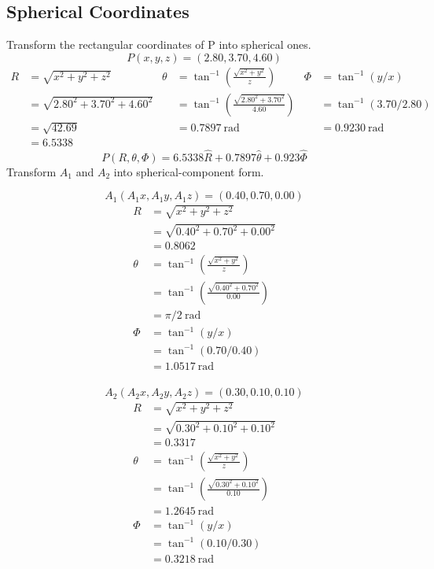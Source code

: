 \documentclass[12pt]{article}
\begin{document}
\subsection{Spherical Coordinates}
Transform the rectangular coordinates of P into spherical ones. $$ P(x,y,z) = (2.80,3.70,4.60) $$
\[
    \begin{aligned}
        R &= \sqrt{x^2+y^2+z^2} & \theta &= \tan^{-1}\left(\frac{\sqrt{x^2+y^2}}{z}\right) & \Phi &= \tan^{-1}\left(y/x\right) \\
        &=\sqrt{2.80^2+3.70^2+4.60^2} & &=\tan^{-1}\left(\frac{\sqrt{2.80^2+3.70^2}}{4.60}\right) & &=\tan^{-1}\left(3.70/2.80\right) \\
        &=\sqrt{42.69} & &= 0.7897 \ \text{rad} & &=0.9230 \ \text{rad} \\
        &= 6.5338
    \end{aligned}
\]
$$ P(R,\theta,\Phi) = 6.5338\hat{R} + 0.7897\hat{\theta} + 0.923\hat{\Phi}$$
Transform $A_1$ and $A_2$ into spherical-component form.
\begin{multicols}{2}
    $$ A_1(A_1x, A_1y, A_1z) = (0.40,0.70,0.00) $$
    \[
        \begin{aligned}
            R &= \sqrt{x^2+y^2+z^2} \\
            &=\sqrt{0.40^2+0.70^2+0.00^2} \\
            &=0.8062 \\
            \theta &= \tan^{-1}\left(\frac{\sqrt{x^2+y^2}}{z}\right) \\
            &= \tan^{-1}\left(\frac{\sqrt{0.40^2+0.70^2}}{0.00}\right) \\
            &= \pi/2 \ \text{rad} \\
            \Phi &= \tan^{-1}\left(y/x\right) \\
            &=\tan^{-1}\left(0.70/0.40\right) \\
            &=1.0517 \ \text{rad}
        \end{aligned}
    \]
    \columnbreak \\
    $$ A_2(A_2x, A_2y, A_2z) = (0.30,0.10,0.10) $$
    \[
        \begin{aligned}
            R &= \sqrt{x^2+y^2+z^2} \\
            &=\sqrt{0.30^2+0.10^2+0.10^2} \\
            &=0.3317 \\
            \theta &= \tan^{-1}\left(\frac{\sqrt{x^2+y^2}}{z}\right) \\
            &= \tan^{-1}\left(\frac{\sqrt{0.30^2+0.10^2}}{0.10}\right) \\
            &= 1.2645 \ \text{rad} \\
            \Phi &= \tan^{-1}\left(y/x\right) \\
            &=\tan^{-1}\left(0.10/0.30\right) \\
            &=0.3218 \ \text{rad}
        \end{aligned}
    \]
\end{multicols}
\end{document}
